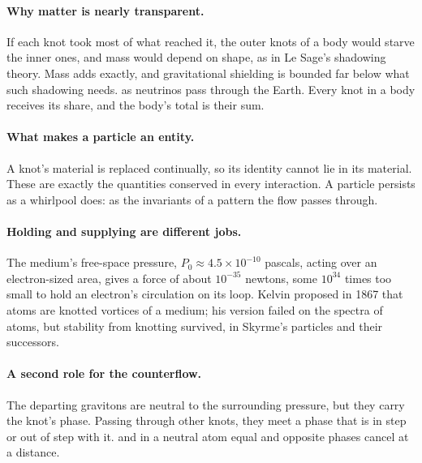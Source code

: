 \documentclass[11pt,a4paper]{article}
\begin{document}
\paragraph{Why matter is nearly transparent.} If each knot took most of what reached it, the outer knots of a body would starve the inner ones, and mass would depend on shape, as in Le Sage's shadowing theory. Mass adds exactly, and gravitational shielding is bounded far below what such shadowing needs.  as neutrinos pass through the Earth. Every knot in a body receives its share, and the body's total is their sum.

\paragraph{What makes a particle an entity.} A knot's material is replaced continually, so its identity cannot lie in its material.  These are exactly the quantities conserved in every interaction. A particle persists as a whirlpool does: as the invariants of a pattern the flow passes through.

\paragraph{Holding and supplying are different jobs.} The medium's free-space pressure, $P_0 \approx 4.5\times10^{-10}$ pascals, acting over an electron-sized area, gives a force of about $10^{-35}$ newtons, some $10^{34}$ times too small to hold an electron's circulation on its loop.  Kelvin proposed in 1867 that atoms are knotted vortices of a medium; his version failed on the spectra of atoms, but stability from knotting survived, in Skyrme's particles and their successors.

\paragraph{A second role for the counterflow.} The departing gravitons are neutral to the surrounding pressure, but they carry the knot's phase. Passing through other knots, they meet a phase that is in step or out of step with it.  and in a neutral atom equal and opposite phases cancel at a distance.
\end{document}
